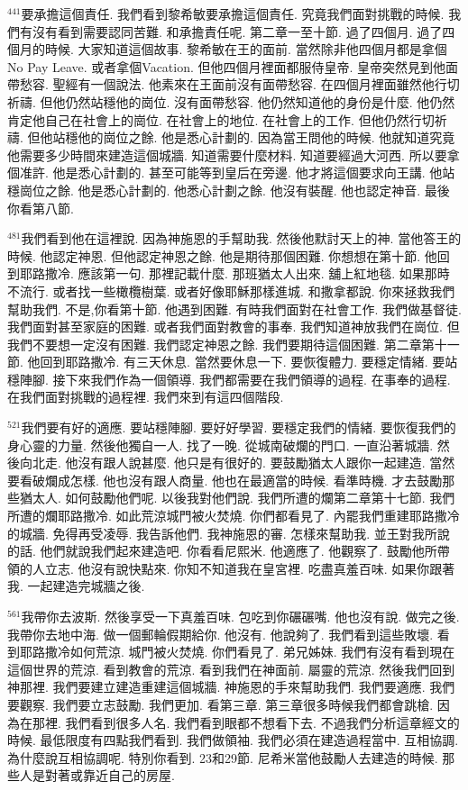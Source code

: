 \documentclass{book}
\begin{document}
$^{441}$要承擔這個責任.
我們看到黎希敏要承擔這個責任.
究竟我們面對挑戰的時候.
我們有沒有看到需要認同苦難.
和承擔責任呢.
第二章一至十節.
過了四個月.
過了四個月的時候.
大家知道這個故事.
黎希敏在王的面前.
當然除非他四個月都是拿個No Pay Leave.
或者拿個Vacation.
但他四個月裡面都服侍皇帝.
皇帝突然見到他面帶愁容.
聖經有一個說法.
他素來在王面前沒有面帶愁容.
在四個月裡面雖然他行切祈禱.
但他仍然站穩他的崗位.
沒有面帶愁容.
他仍然知道他的身份是什麼.
他仍然肯定他自己在社會上的崗位.
在社會上的地位.
在社會上的工作.
但他仍然行切祈禱.
但他站穩他的崗位之餘.
他是悉心計劃的.
因為當王問他的時候.
他就知道究竟他需要多少時間來建造這個城牆.
知道需要什麼材料.
知道要經過大河西.
所以要拿個准許.
他是悉心計劃的.
甚至可能等到皇后在旁邊.
他才將這個要求向王講.
他站穩崗位之餘.
他是悉心計劃的.
他悉心計劃之餘.
他沒有裝醒.
他也認定神音.
最後你看第八節.

$^{481}$我們看到他在這裡說.
因為神施恩的手幫助我.
然後他默討天上的神.
當他答王的時候.
他認定神恩.
但他認定神恩之餘.
他是期待那個困難.
你想想在第十節.
他回到耶路撒冷.
應該第一句.
那裡記載什麼.
那班猶太人出來.
舖上紅地毯.
如果那時不流行.
或者找一些橄欖樹葉.
或者好像耶穌那樣進城.
和撒拿都說.
你來拯救我們幫助我們.
不是,你看第十節.
他遇到困難.
有時我們面對在社會工作.
我們做基督徒.
我們面對甚至家庭的困難.
或者我們面對教會的事奉.
我們知道神放我們在崗位.
但我們不要想一定沒有困難.
我們認定神恩之餘.
我們要期待這個困難.
第二章第十一節.
他回到耶路撒冷.
有三天休息.
當然要休息一下.
要恢復體力.
要穩定情緒.
要站穩陣腳.
接下來我們作為一個領導.
我們都需要在我們領導的過程.
在事奉的過程.
在我們面對挑戰的過程裡.
我們來到有這四個階段.

$^{521}$我們要有好的適應.
要站穩陣腳.
要好好學習.
要穩定我們的情緒.
要恢復我們的身心靈的力量.
然後他獨自一人.
找了一晚.
從城南破爛的門口.
一直沿著城牆.
然後向北走.
他沒有跟人說甚麼.
他只是有很好的.
要鼓勵猶太人跟你一起建造.
當然要看破爛成怎樣.
他也沒有跟人商量.
他也在最適當的時候.
看準時機.
才去鼓勵那些猶太人.
如何鼓勵他們呢.
以後我對他們說.
我們所遭的爛第二章第十七節.
我們所遭的爛耶路撒冷.
如此荒涼城門被火焚燒.
你們都看見了.
內罷我們重建耶路撒冷的城牆.
免得再受凌辱.
我告訴他們.
我神施恩的審.
怎樣來幫助我.
並王對我所說的話.
他們就說我們起來建造吧.
你看看尼熙米.
他適應了.
他觀察了.
鼓勵他所帶領的人立志.
他沒有說快點來.
你知不知道我在皇宮裡.
吃盡真羞百味.
如果你跟著我.
一起建造完城牆之後.

$^{561}$我帶你去波斯.
然後享受一下真羞百味.
包吃到你碾碾嘴.
他也沒有說.
做完之後.
我帶你去地中海.
做一個郵輪假期給你.
他沒有.
他說夠了.
我們看到這些敗壞.
看到耶路撒冷如何荒涼.
城門被火焚燒.
你們看見了.
弟兄姊妹.
我們有沒有看到現在這個世界的荒涼.
看到教會的荒涼.
看到我們在神面前.
屬靈的荒涼.
然後我們回到神那裡.
我們要建立建造重建這個城牆.
神施恩的手來幫助我們.
我們要適應.
我們要觀察.
我們要立志鼓勵.
我們更加.
看第三章.
第三章很多時候我們都會跳槍.
因為在那裡.
我們看到很多人名.
我們看到眼都不想看下去.
不過我們分析這章經文的時候.
最低限度有四點我們看到.
我們做領袖.
我們必須在建造過程當中.
互相協調.
為什麼說互相協調呢.
特別你看到.
23和29節.
尼希米當他鼓勵人去建造的時候.
那些人是對著或靠近自己的房屋.
\end{document}
